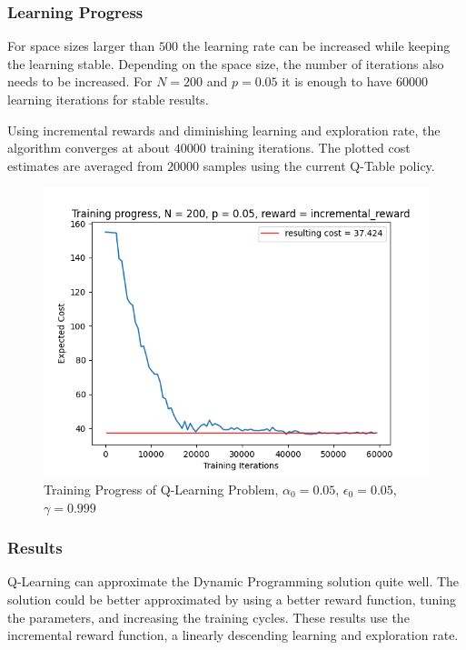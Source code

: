 \subsubsection{Learning Progress}
For space sizes larger than $500$ the learning rate can be increased while keeping the learning stable. Depending on the space size, the number of iterations also needs to be increased.
For $N=200$ and $p = 0.05$ it is enough to have $60000$ learning iterations for stable results.

Using incremental rewards and diminishing learning and exploration rate, the algorithm converges at about $40000$ training iterations. The plotted cost estimates are averaged from $20000$ samples using the current Q-Table policy.

\begin{figure}[htp]
	\centering
	\includegraphics[scale=0.6]{figures/code_statistics/q_training_progress_200.png}
	\caption{Training Progress of Q-Learning Problem, $\alpha_0 = 0.05$, $\epsilon_0 = 0.05$, $\gamma = 0.999$}
\end{figure}

\FloatBarrier

\subsubsection{Results}
Q-Learning can approximate the Dynamic Programming solution quite well. The solution could be better approximated by using a better reward function, tuning the parameters, and increasing the training cycles.
These results use the incremental reward function, a linearly descending learning and exploration rate.

